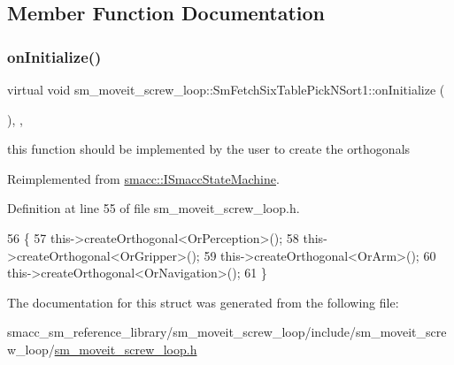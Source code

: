 \subsection{Member Function Documentation}
\mbox{\label{structsm__moveit__screw__loop_1_1SmFetchSixTablePickNSort1_a1d6d736d4261244a85c293b53ccce2c4}} 
\subsubsection{\texorpdfstring{on\+Initialize()}{onInitialize()}}
{\footnotesize\ttfamily virtual void sm\+\_\+moveit\+\_\+screw\+\_\+loop\+::\+Sm\+Fetch\+Six\+Table\+Pick\+N\+Sort1\+::on\+Initialize (\begin{DoxyParamCaption}{ }\end{DoxyParamCaption})\hspace{0.3cm}{\ttfamily [inline]}, {\ttfamily [override]}, {\ttfamily [virtual]}}



this function should be implemented by the user to create the orthogonals 



Reimplemented from \hyperlink{classsmacc_1_1ISmaccStateMachine_ac2982c6c8283663e5e1e8a7c82f511ec}{smacc\+::\+I\+Smacc\+State\+Machine}.



Definition at line 55 of file sm\+\_\+moveit\+\_\+screw\+\_\+loop.\+h.


\begin{DoxyCode}
56         \{
57             this->createOrthogonal<OrPerception>();
58             this->createOrthogonal<OrGripper>();
59             this->createOrthogonal<OrArm>();
60             this->createOrthogonal<OrNavigation>();
61         \}
\end{DoxyCode}


The documentation for this struct was generated from the following file\+:\begin{DoxyCompactItemize}
\item 
smacc\+\_\+sm\+\_\+reference\+\_\+library/sm\+\_\+moveit\+\_\+screw\+\_\+loop/include/sm\+\_\+moveit\+\_\+screw\+\_\+loop/\hyperlink{sm__moveit__screw__loop_8h}{sm\+\_\+moveit\+\_\+screw\+\_\+loop.\+h}\end{DoxyCompactItemize}
